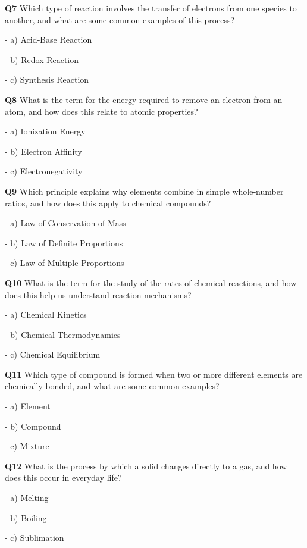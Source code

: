 \textbf{Q7} Which type of reaction involves the transfer of electrons from one species to another, and what are some common examples of this process?\par
\quad - a) Acid‑Base Reaction\par
\quad - b) Redox Reaction\par
\quad - c) Synthesis Reaction\par

\textbf{Q8} What is the term for the energy required to remove an electron from an atom, and how does this relate to atomic properties?\par
\quad - a) Ionization Energy\par
\quad - b) Electron Affinity\par
\quad - c) Electronegativity\par

\textbf{Q9} Which principle explains why elements combine in simple whole‑number ratios, and how does this apply to chemical compounds?\par
\quad - a) Law of Conservation of Mass\par
\quad - b) Law of Definite Proportions\par
\quad - c) Law of Multiple Proportions\par

\textbf{Q10} What is the term for the study of the rates of chemical reactions, and how does this help us understand reaction mechanisms?\par
\quad - a) Chemical Kinetics\par
\quad - b) Chemical Thermodynamics\par
\quad - c) Chemical Equilibrium\par

\textbf{Q11} Which type of compound is formed when two or more different elements are chemically bonded, and what are some common examples?\par
\quad - a) Element\par
\quad - b) Compound\par
\quad - c) Mixture\par

\textbf{Q12} What is the process by which a solid changes directly to a gas, and how does this occur in everyday life?\par
\quad - a) Melting\par
\quad - b) Boiling\par
\quad - c) Sublimation\par

